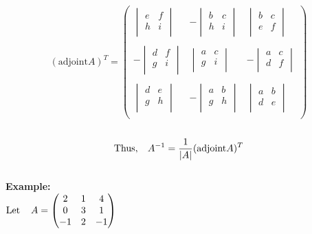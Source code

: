 \documentclass[11pt,a4paper]{article}
\begin{document}
$$
(\text{adjoint} A)^T=
\begin{pmatrix}
\begin{vmatrix}
e & f\\
h & i\\
\end{vmatrix}
& -
\begin{vmatrix}
b & c\\
h & i\\
\end{vmatrix}
&
\begin{vmatrix}
b & c\\
e & f\\
\end{vmatrix}\\\\
-
\begin{vmatrix}
d & f\\
g & i\\
\end{vmatrix}
&
\begin{vmatrix}
a & c\\
g & i\\
\end{vmatrix}
& -
\begin{vmatrix}
a & c\\
d & f\\
\end{vmatrix}\\\\
\begin{vmatrix}
d & e\\
g & h\\
\end{vmatrix}
& -
\begin{vmatrix}
a & b\\
g & h\\
\end{vmatrix}
&
\begin{vmatrix}
a & b\\
d & e\\
\end{vmatrix}\\
\end{pmatrix}
$$\\


$$\text{Thus},\hspace{0.3cm} A^{-1}=\frac{1}{|A|}(\text{adjoint} A )^T$$\\

\textbf{Example:}\\
$\text{Let}\hspace{0.4cm} A=
\begin{pmatrix}
2 & 1 & 4\\
0 & 3 & 1\\
-1 & 2 & -1\\
\end{pmatrix}
$
\end{document}
